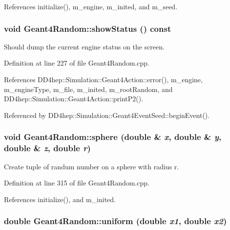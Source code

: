 References initialize(), m\_\-engine, m\_\-inited, and m\_\-seed.\hypertarget{class_d_d4hep_1_1_simulation_1_1_geant4_random_a523d8d48f4a11d28ae471a8f385151d7}{
\subsubsection[{showStatus}]{\setlength{\rightskip}{0pt plus 5cm}void Geant4Random::showStatus () const}}
\label{class_d_d4hep_1_1_simulation_1_1_geant4_random_a523d8d48f4a11d28ae471a8f385151d7}


Should dump the current engine status on the screen. 

Definition at line 227 of file Geant4Random.cpp.

References DD4hep::Simulation::Geant4Action::error(), m\_\-engine, m\_\-engineType, m\_\-file, m\_\-inited, m\_\-rootRandom, and DD4hep::Simulation::Geant4Action::printP2().

Referenced by DD4hep::Simulation::Geant4EventSeed::beginEvent().\hypertarget{class_d_d4hep_1_1_simulation_1_1_geant4_random_af0825e540ad54e3510b4e5a1450a3211}{
\subsubsection[{sphere}]{\setlength{\rightskip}{0pt plus 5cm}void Geant4Random::sphere (double \& {\em x}, \/  double \& {\em y}, \/  double \& {\em z}, \/  double {\em r})}}
\label{class_d_d4hep_1_1_simulation_1_1_geant4_random_af0825e540ad54e3510b4e5a1450a3211}


Create tuple of randum number on a sphere with radius r. 

Definition at line 315 of file Geant4Random.cpp.

References initialize(), and m\_\-inited.\hypertarget{class_d_d4hep_1_1_simulation_1_1_geant4_random_a5e717c2a88ed9c72dcfb8e2de1c4bef3}{
\subsubsection[{uniform}]{\setlength{\rightskip}{0pt plus 5cm}double Geant4Random::uniform (double {\em x1}, \/  double {\em x2})}}
\label{class_d_d4hep_1_1_simulation_1_1_geant4_random_a5e717c2a88ed9c72dcfb8e2de1c4bef3}


